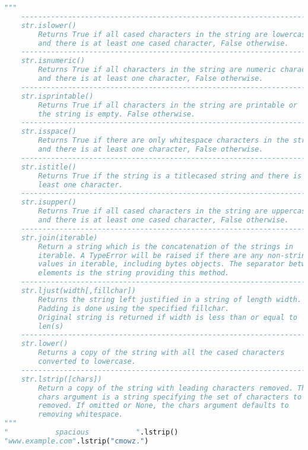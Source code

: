 \documentclass[a4paper,landscape]{report}
\begin{document}
\begin{lstlisting}[language=Python]
"""
    ---------------------------------------------------------------------
    str.islower()
        Returns True if all cased characters in the string are lowercase
        and there is at least one cased character, False otherwise.
    ---------------------------------------------------------------------
    str.isnumeric()
        Returns True if all characters in the string are numeric characters
        and there is at least one character, False otherwise.
    ---------------------------------------------------------------------
    str.isprintable()
        Returns True if all characters in the string are printable or
        the string is empty. False otherwise.
    ---------------------------------------------------------------------
    str.isspace()
        Returns True if there are only whitespace characters in the string
        and there is at least one character, False otherwise.
    ---------------------------------------------------------------------
    str.istitle()
        Returns True if the string is a titlecased string and there is at
        least one character.
    ---------------------------------------------------------------------
    str.isupper()
        Returns True if all cased characters in the string are uppercase
        and there is at least one cased character, False otherwise.
    ---------------------------------------------------------------------
    str.join(iterable)
        Return a string which is the concatenation of the strings in
        iterable. A TypeError will be raised if there are any non-string
        values in iterable, including bytes objects. The separator between
        elements is the string providing this method.
    ---------------------------------------------------------------------
    str.ljust(width[,fillchar])
        Returns the string left justified in a string of length width.
        Padding is done using the specified fillchar.
        Original string is returned if width is less than or equal to
        len(s)
    ---------------------------------------------------------------------
    str.lower()
        Returns a copy of the string with all the cased characters
        converted to lowercase.
    ---------------------------------------------------------------------
    str.lstrip([chars])
        Return a copy of the string with leading characters removed. The
        chars argument is a string specifying the set of characters to be
        removed. If omitted or None, the chars argument defaults to 
        removing whitespace.
"""
"           spacious           ".lstrip()
"www.example.com".lstrip("cmowz.")


\end{lstlisting}
\end{document}
